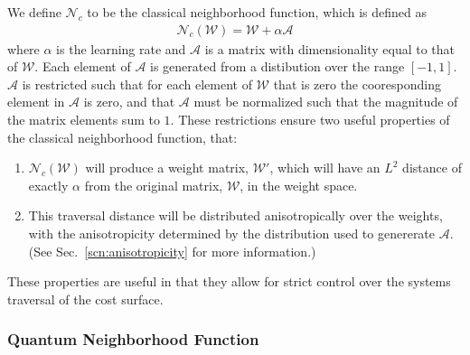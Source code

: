 \documentclass[10pt,journal,cspaper,compsoc]{IEEEtran}
\begin{document}
We define \begin{math}\mathcal{N}_{c}\end{math} to be the classical neighborhood function, which is defined as \begin{align}\label{eq:classical_anisotropic_neighborhood}
	\mathcal{N}_{c} (\boldsymbol{\mathcal{W}}) = \boldsymbol{\mathcal{W}} + \alpha\boldsymbol{\mathcal{A}} 
\end{align}
\noindent where $\alpha$ is the learning rate and $\boldsymbol{\mathcal{A}}$ is a matrix with dimensionality equal to that of $\boldsymbol{\mathcal{W}}$. Each element of $\boldsymbol{\mathcal{A}}$ is generated from a distibution over the range $[-1,1]$.  $\boldsymbol{\mathcal{A}}$ is restricted such that for each element of $\boldsymbol{\mathcal{W}}$ that is zero the cooresponding element in $\boldsymbol{\mathcal{A}}$ is zero, and that $\boldsymbol{\mathcal{A}}$ must be normalized such that the magnitude of the matrix elements sum to $1$. These restrictions ensure two useful properties of the classical neighborhood function, that: 

\begin{enumerate}
	\item $\mathcal{N}_{c} (\boldsymbol{\mathcal{W}})$ will produce a weight matrix, $\boldsymbol{\mathcal{W}'}$, which will have an $L^2$ distance of exactly $\alpha$ from the original matrix, $\boldsymbol{\mathcal{W}}$, in the weight space.
	\item This traversal distance will be distributed anisotropically over the weights, with the anisotropicity determined by the distribution used to genererate $\boldsymbol{\mathcal{A}}$. (See Sec.~\ref{scn:anisotropicity} for more information.)
\end{enumerate}
These properties are useful in that they allow for strict control over the systems traversal of the cost surface.


\subsubsection{Quantum Neighborhood Function}
\label{scn:quantum_neighborhood}
\end{document}
